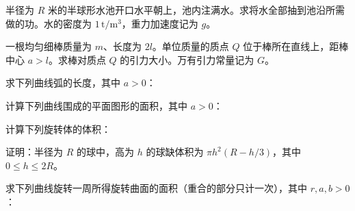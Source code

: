 \noindent\begin{minipage}{\textwidth}
半径为 $R$ 米的半球形水池开口水平朝上，池内注满水。求将水全部抽到池沿所需做的功。水的密度为 $1\,\mathrm{t}/\mathrm m^3$，重力加速度记为 $g$。
\end{minipage}\par\vfill
\noindent\begin{minipage}{\textwidth}
一根均匀细棒质量为 $m$、长度为 $2l$。单位质量的质点 $Q$ 位于棒所在直线上，距棒中心 $a>l$。求棒对质点 $Q$ 的引力大小。万有引力常量记为 $G$。
\end{minipage}\par\vfill
\newpage
\noindent\begin{minipage}{\textwidth}
求下列曲线弧的长度，其中 $a>0$：
\end{minipage}\par\vfill
\noindent\begin{minipage}{\textwidth}
计算下列曲线围成的平面图形的面积，其中 $a>0$：
\end{minipage}\par\vfill
\noindent\begin{minipage}{\textwidth}
计算下列旋转体的体积：
\end{minipage}\par\vfill
\noindent\begin{minipage}{\textwidth}
证明：半径为 $R$ 的球中，高为 $h$ 的球缺体积为 $\pi h^2(R-h/3)$，其中 $0\le h\le2R$。
\end{minipage}\par\vfill
\newpage
\noindent\begin{minipage}{\textwidth}
求下列曲线旋转一周所得旋转曲面的面积（重合的部分只计一次），其中 $r,a,b>0$：
\end{minipage}\par\vfill
